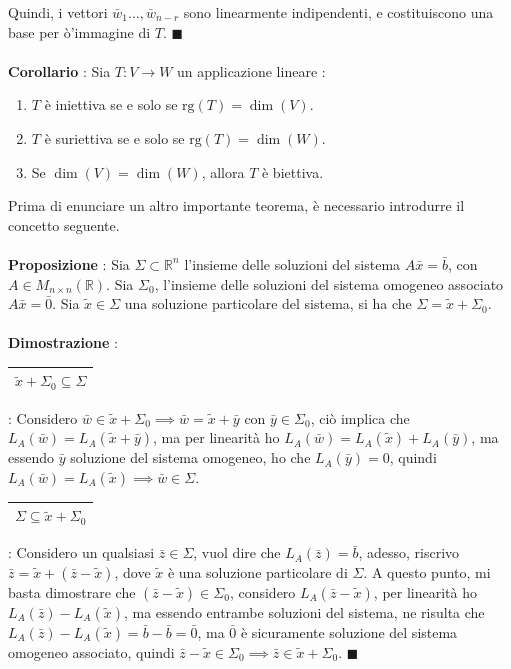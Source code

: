 \documentclass[12pt, letterpaper]{article}
\newcommand{\R}{{\mathbb R}}
\newcommand{\rg}{{\text{rg}}}
\newcommand{\acc}{\\\hphantom{}\\}
\newcommand{\boxedMath}[1]{\begin{tabular}{|c|}\hline \texttt{#1} \\ \hline\end{tabular} :}
\begin{document}
Quindi, i vettori \(\bar w_1\dots,\bar w_{n-r}\) sono linearmente indipendenti, e costituiscono una base per 
ò'immagine di \(T\). \(\blacksquare\)\acc
\textbf{Corollario} : Sia \(T:V\rightarrow W\) un applicazione lineare :\begin{enumerate}
    \item  \(T\) è iniettiva se e solo se \(\rg(T)=\dim(V)\).
    \item  \(T\) è suriettiva se e solo se \(\rg(T)=\dim(W)\).
    \item Se  \(\dim(V)=\dim(W)\), allora \(T\) è biettiva.
\end{enumerate}
Prima di enunciare un altro importante teorema, è necessario introdurre il concetto seguente.\acc 
\textbf{Proposizione} : Sia \(\Sigma\subset \R^n\) l'insieme delle soluzioni del sistema \(A\bar x = \bar b\), 
con \(A\in M_{n\times n}(\R)\). Sia \(\Sigma_0\), l'insieme delle soluzioni del sistema omogeneo associato \(A\bar x = \bar 0\).
Sia \(\tilde x\in \Sigma\) una soluzione particolare del sistema, si ha che \(\Sigma=\tilde x +\Sigma_0\).\acc 
\textbf{Dimostrazione} : \boxedMath{\(\tilde x +\Sigma_0\subseteq \Sigma\)} Considero \(\bar w\in \tilde x +\Sigma_0\implies
\bar w = \tilde x +\bar y\) con \(\bar y\in \Sigma_0\), ciò implica che \(L_A(\bar w)=L_A(\tilde x +\bar y)\), ma per linearità 
ho \(L_A(\bar w)=L_A(\tilde x) +L_A(\bar y)\), ma essendo \(\bar y\) soluzione del sistema omogeneo, ho che \(L_A(\bar y)=0\),
quindi \(L_A(\bar w)=L_A(\tilde x)\implies \bar w\in \Sigma\).\\
\boxedMath{\(\Sigma\subseteq \tilde x +\Sigma_0\)} Considero un qualsiasi \(\bar z\in \Sigma\), vuol dire che 
\(L_A(\bar z)=\bar b\), adesso, riscrivo \(\bar z=\tilde x +(\bar z - \tilde x)\), dove \(\tilde x\) è una soluzione 
particolare di \(\Sigma\). A questo punto, mi basta dimostrare che \((\bar z - \tilde x)\in \Sigma_0\), considero 
\(L_A(\bar z-\tilde x)\), per linearità ho \(L_A(\bar z)-L_A(\tilde x)\), ma essendo entrambe soluzioni del sistema, 
ne risulta che \(L_A(\bar z)-L_A(\tilde x)=\bar b-\bar b=\bar 0\), ma \(\bar 0\) è sicuramente soluzione del 
sistema omogeneo associato, quindi \(\bar z - \tilde x\in \Sigma_0\implies \bar z \in \tilde x+ \Sigma_0\). \(\blacksquare\)
\end{document}
